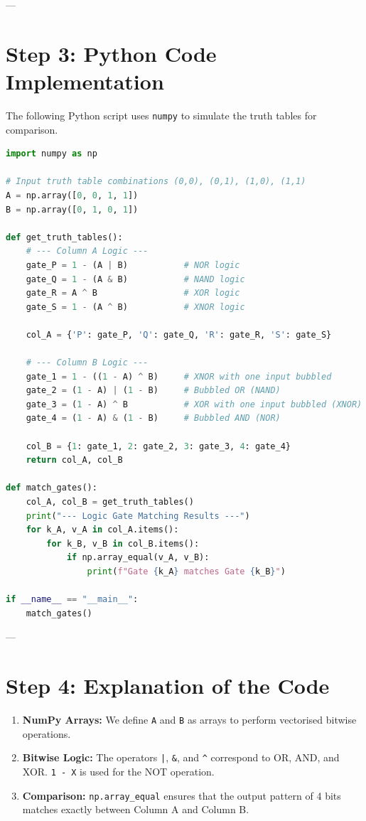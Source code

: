 \documentclass[11pt]{article}
\begin{document}
---

\section{Step 3: Python Code Implementation}
The following Python script uses \texttt{numpy} to simulate the truth tables for comparison.

\begin{lstlisting}[language=Python]
import numpy as np

# Input truth table combinations (0,0), (0,1), (1,0), (1,1)
A = np.array([0, 0, 1, 1])
B = np.array([0, 1, 0, 1])

def get_truth_tables():
    # --- Column A Logic ---
    gate_P = 1 - (A | B)           # NOR logic
    gate_Q = 1 - (A & B)           # NAND logic
    gate_R = A ^ B                 # XOR logic
    gate_S = 1 - (A ^ B)           # XNOR logic
    
    col_A = {'P': gate_P, 'Q': gate_Q, 'R': gate_R, 'S': gate_S}

    # --- Column B Logic ---
    gate_1 = 1 - ((1 - A) ^ B)     # XNOR with one input bubbled
    gate_2 = (1 - A) | (1 - B)     # Bubbled OR (NAND)
    gate_3 = (1 - A) ^ B           # XOR with one input bubbled (XNOR)
    gate_4 = (1 - A) & (1 - B)     # Bubbled AND (NOR)

    col_B = {1: gate_1, 2: gate_2, 3: gate_3, 4: gate_4}
    return col_A, col_B

def match_gates():
    col_A, col_B = get_truth_tables()
    print("--- Logic Gate Matching Results ---")
    for k_A, v_A in col_A.items():
        for k_B, v_B in col_B.items():
            if np.array_equal(v_A, v_B):
                print(f"Gate {k_A} matches Gate {k_B}")

if __name__ == "__main__":
    match_gates()
\end{lstlisting}

---

\section{Step 4: Explanation of the Code}
\begin{enumerate}
    \item \textbf{NumPy Arrays:} We define \texttt{A} and \texttt{B} as arrays to perform vectorised bitwise operations.
    \item \textbf{Bitwise Logic:} The operators \texttt{|}, \texttt{\&}, and \texttt{\^} correspond to OR, AND, and XOR. \texttt{1 - X} is used for the NOT operation.
    \item \textbf{Comparison:} \texttt{np.array\_equal} ensures that the output pattern of 4 bits matches exactly between Column A and Column B.
\end{enumerate}
\end{document}
